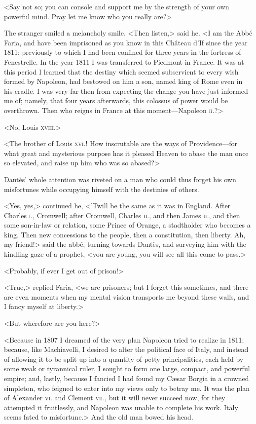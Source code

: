  <Say not so; you can console and support me by the strength of your own powerful mind. Pray let me know who you really are?> 

 The stranger smiled a melancholy smile. <Then listen,> said he. <I am the Abbé Faria, and have been imprisoned as you know in this Château d'If since the year 1811; previously to which I had been confined for three years in the fortress of Fenestrelle. In the year 1811 I was transferred to Piedmont in France. It was at this period I learned that the destiny which seemed subservient to every wish formed by Napoleon, had bestowed on him a son, named king of Rome even in his cradle. I was very far then from expecting the change you have just informed me of; namely, that four years afterwards, this colossus of power would be overthrown. Then who reigns in France at this moment—Napoleon \textsc{ii.}?> 

 <No, Louis \textsc{xviii.}> 

 <The brother of Louis \textsc{xvi.}! How inscrutable are the ways of Providence—for what great and mysterious purpose has it pleased Heaven to abase the man once so elevated, and raise up him who was so abased?> 

 Dantès' whole attention was riveted on a man who could thus forget his own misfortunes while occupying himself with the destinies of others. 

 <Yes, yes,> continued he, <'Twill be the same as it was in England. After Charles \textsc{i.}, Cromwell; after Cromwell, Charles \textsc{ii.}, and then James \textsc{ii.}, and then some son-in-law or relation, some Prince of Orange, a stadtholder who becomes a king. Then new concessions to the people, then a constitution, then liberty. Ah, my friend!> said the abbé, turning towards Dantès, and surveying him with the kindling gaze of a prophet, <you are young, you will see all this come to pass.> 

 <Probably, if ever I get out of prison!> 

 <True,> replied Faria, <we are prisoners; but I forget this sometimes, and there are even moments when my mental vision transports me beyond these walls, and I fancy myself at liberty.> 

 <But wherefore are you here?> 

 <Because in 1807 I dreamed of the very plan Napoleon tried to realize in 1811; because, like Machiavelli, I desired to alter the political face of Italy, and instead of allowing it to be split up into a quantity of petty principalities, each held by some weak or tyrannical ruler, I sought to form one large, compact, and powerful empire; and, lastly, because I fancied I had found my Cæsar Borgia in a crowned simpleton, who feigned to enter into my views only to betray me. It was the plan of Alexander \textsc{vi.} and Clement \textsc{vii.}, but it will never succeed now, for they attempted it fruitlessly, and Napoleon was unable to complete his work. Italy seems fated to misfortune.> And the old man bowed his head. 

